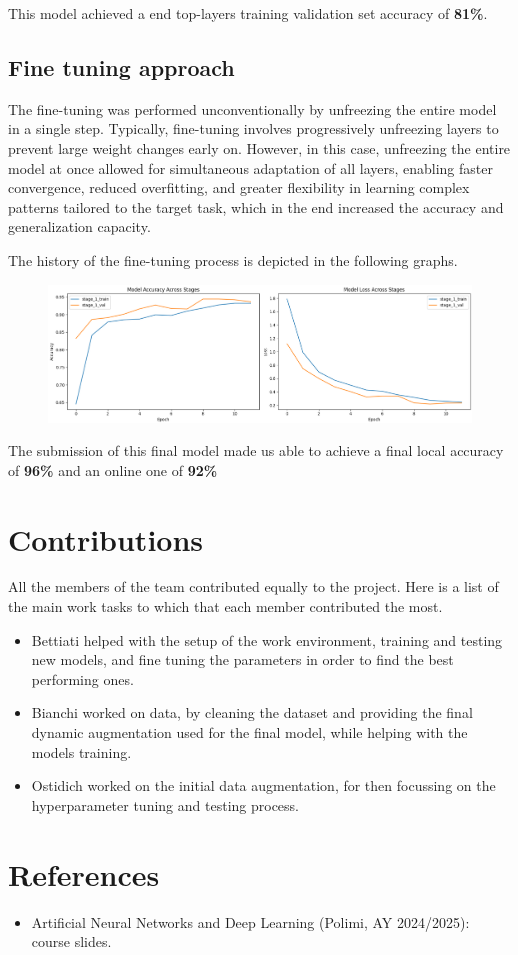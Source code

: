 \documentclass[11pt]{article}
\begin{document}
This model achieved a end top-layers training validation set accuracy of \textbf{81\%}.

\subsection{Fine tuning approach}

The fine-tuning was performed unconventionally by unfreezing the entire model in a single step.
Typically, fine-tuning involves progressively unfreezing layers to prevent large weight changes early on.
However, in this case, unfreezing the entire model at once allowed for simultaneous adaptation of all layers, enabling faster convergence, reduced overfitting, and greater flexibility in learning complex patterns tailored to the target task, which in the end increased the accuracy and generalization capacity.

The history of the fine-tuning process is depicted in the following graphs.

\begin{figure}[h!]
    \centering
    \includegraphics[width=\textwidth]{images/final_model_history.png}

\end{figure}

The submission of this final model made us able to achieve a final local accuracy of \textbf{96\%} and an online one of \textbf{92\%}

\section{Contributions}

All the members of the team contributed equally to the project. 
Here is a list of the main work tasks to which that each member contributed the most.

\begin{itemize}
    \item Bettiati helped with the setup of the work environment, training and testing new models, and fine tuning the parameters in order to find the best performing ones.
    \item Bianchi worked on data, by cleaning the dataset and providing the final dynamic augmentation used for the final model, while helping with the models training.
    \item Ostidich worked on the initial data augmentation, for then focussing on the hyperparameter tuning and testing process.
\end{itemize}

\section{References}

\begin{itemize}
    \item Artificial Neural Networks and Deep Learning (Polimi, AY 2024/2025): course slides.
\end{itemize}
\end{document}
